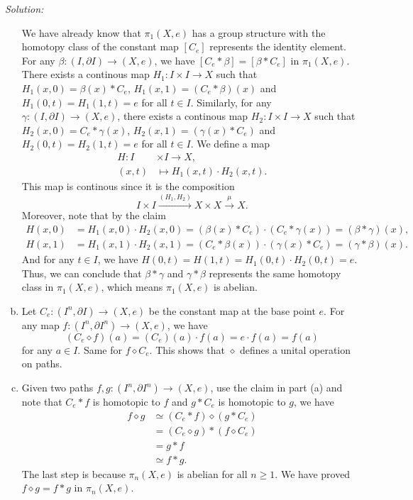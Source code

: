 \documentclass[a4paper, 12pt]{article}
\newenvironment{solution}
    {\textit{Solution:}}
    {}
\begin{document}
\begin{solution}
\begin{enumerate}[(a)]
We have already know that \(\pi_1(X,e)\) has a group structure with the homotopy class of the constant map \([C_e]\) represents the identity element. For any \(\beta:(I,\partial I)\rightarrow (X,e)\), we have 
\([C_e*\beta]=[\beta*C_e]\) in \(\pi_1(X,e)\). There exists a continous map 
\(H_1:I\times I\rightarrow X\) such that \(H_1(x,0)=\beta(x)*C_e\), \(H_1(x,1)=(C_e*\beta)(x)\) and \(H_1(0,t)=H_1(1,t)=e\) for all \(t\in I\). Similarly, for any \(\gamma:(I,\partial I)\rightarrow (X,e)\), there exists a continous map 
\(H_2:I\times I\rightarrow X\) such that \(H_2(x,0)=C_e*\gamma(x)\), \(H_2(x,1)=(\gamma(x)*C_e)\) and \(H_2(0,t)=H_2(1,t)=e\) for all \(t\in I\). We define a map 
\begin{align*}
	H:I&\times I\rightarrow X,\\
	(x,t)&\mapsto H_1(x,t)\cdot H_2(x,t).
\end{align*}
This map is continous since it is the composition 
\[I\times I\xrightarrow{(H_1,H_2)}X\times X\xrightarrow{\mu} X.\]
Moreover, note that by the claim 
\begin{align*}
	H(x,0)&=H_1(x,0)\cdot H_2(x,0)=(\beta(x)*C_e)\cdot(C_e*\gamma(x))=(\beta*\gamma)(x),\\ 
	H(x,1)&=H_1(x,1)\cdot H_2(x,1)=(C_e*\beta(x))\cdot(\gamma(x)*C_e)=(\gamma*\beta)(x).
\end{align*}
And for any \(t\in I\), we have \(H(0,t)=H(1,t)=H_1(0,t)\cdot H_2(0,t)=e\). Thus, we can conclude that \(\beta*\gamma\) and \(\gamma*\beta\) represents the same homotopy class in \(\pi_1(X,e)\), which means \(\pi_1(X,e)\) is abelian.
\item Let \(C_e:(I^n,\partial I)\rightarrow (X,e)\) be the constant map at the base point \(e\). For any map \(f:(I^n,\partial I^n)\rightarrow (X,e)\), we have 
\[(C_e\diamond f)(a)=(C_e)(a)\cdot f(a)=e\cdot f(a)=f(a)\]
for any \(a\in I\). Same for \(f\diamond C_e\). This shows that \(\diamond\) defines a unital operation on paths. 
\item Given two paths \(f,g:(I^n,\partial I^n)\rightarrow (X,e)\), use the claim in part (a) and note that \(C_e*f\) is homotopic to \(f\) and \(g*C_e\) is homotopic to \(g\), we have 
\begin{align*}
f\diamond g &\simeq (C_e*f)\diamond (g*C_e)\\ 
            &=(C_e\diamond g)*(f\diamond C_e)\\ 
			&=g*f\\ 
			&\simeq f*g.
\end{align*}
The last step is because \(\pi_n(X,e)\) is abelian for all \(n\geq 1\). We have proved \(f\diamond g=f*g\) in \(\pi_n(X,e)\).
\end{enumerate}
\end{solution}
\end{document}

